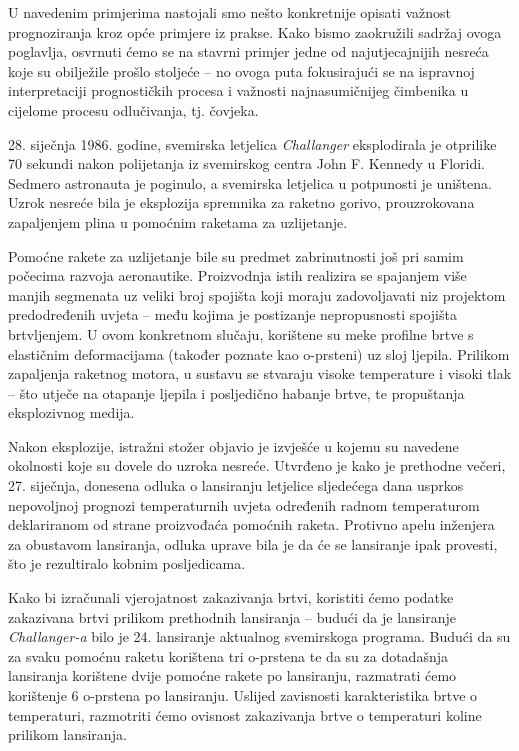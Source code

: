 \documentclass[a4paper,12pt,oneside]{memoir}
\begin{document}
        U navedenim primjerima nastojali smo nešto konkretnije opisati važnost prognoziranja kroz opće primjere iz prakse. Kako bismo zaokružili sadržaj ovoga poglavlja, osvrnuti ćemo se na stavrni primjer jedne od najutjecajnijih nesreća koje su obilježile prošlo stoljeće --  no ovoga puta fokusirajući se na ispravnoj interpretaciji prognostičkih procesa i važnosti najnasumičnijeg čimbenika u cijelome procesu odlučivanja, tj. čovjeka.


        28. siječnja 1986. godine, svemirska letjelica \textit{Challanger} eksplodirala je otprilike 70 sekundi nakon polijetanja iz svemirskog centra John F. Kennedy u Floridi. Sedmero astronauta je poginulo, a svemirska letjelica u potpunosti je uništena. Uzrok nesreće bila je eksplozija spremnika za raketno gorivo, prouzrokovana zapaljenjem plina u pomoćnim raketama za uzlijetanje.

        Pomoćne rakete za uzlijetanje bile su predmet zabrinutnosti još pri samim počecima razvoja aeronautike. Proizvodnja istih realizira se spajanjem više manjih segmenata uz veliki broj spojišta koji moraju zadovoljavati niz projektom predodređenih uvjeta -- među kojima je postizanje nepropusnosti spojišta brtvljenjem. U ovom konkretnom slučaju, korištene su meke profilne brtve s elastičnim deformacijama (također poznate kao o-prsteni) uz sloj ljepila. Prilikom zapaljenja raketnog motora, u sustavu se stvaraju visoke temperature i visoki tlak -- što utječe na otapanje ljepila i posljedično habanje brtve, te propuštanja eksplozivnog medija.

        Nakon eksplozije, istražni stožer objavio je izvješće u kojemu su navedene okolnosti koje su dovele do uzroka nesreće. Utvrđeno je kako je prethodne večeri, 27. siječnja, donesena odluka o lansiranju letjelice sljedećega dana usprkos nepovoljnoj prognozi temperaturnih uvjeta određenih radnom temperaturom deklariranom od strane proizvođaća pomoćnih raketa. Protivno apelu inženjera za obustavom lansiranja, odluka uprave bila je da će se lansiranje ipak provesti, što je rezultiralo kobnim posljedicama.


        Kako bi izračunali vjerojatnost zakazivanja brtvi, koristiti ćemo podatke zakazivana brtvi prilikom prethodnih lansiranja -- budući da je lansiranje \textit{Challanger-a} bilo je 24. lansiranje aktualnog svemirskoga programa. Budući da su za svaku pomoćnu raketu korištena tri o-prstena te da su za dotadašnja lansiranja korištene dvije pomoćne rakete po lansiranju, razmatrati ćemo korištenje 6 o-prstena po lansiranju. Uslijed zavisnosti karakteristika brtve o temperaturi, razmotriti ćemo ovisnost zakazivanja brtve o temperaturi koline prilikom lansiranja.
\end{document}

